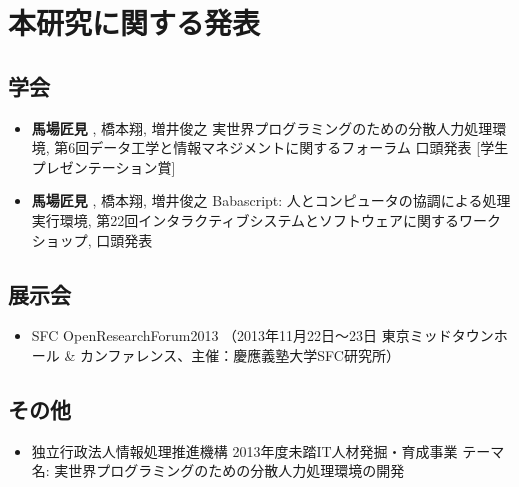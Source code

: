 \chapter*{本研究に関する発表}
\label{chap:publications}

\section*{学会}

\begin{itemize}
\itemsep1pt\parskip0pt
\item
  \textbf{馬場匠見} , 橋本翔, 増井俊之
  実世界プログラミングのための分散人力処理環境,
  第6回データ工学と情報マネジメントに関するフォーラム 口頭発表
  {[}学生プレゼンテーション賞{]}
\item
  \textbf{馬場匠見} , 橋本翔, 増井俊之 Babascript:
  人とコンピュータの協調による処理実行環境,
  第22回インタラクティブシステムとソフトウェアに関するワークショップ,
  口頭発表
\end{itemize}

\section*{展示会}

\begin{itemize}
\itemsep1pt\parskip0pt
\item
  SFC OpenResearchForum2013 （2013年11月22日〜23日
  東京ミッドタウンホール \&
  カンファレンス、主催：慶應義塾大学SFC研究所）
\end{itemize}

\section*{その他}

\begin{itemize}
\itemsep1pt\parskip0pt
\item
  独立行政法人情報処理推進機構 2013年度未踏IT人材発掘・育成事業
  テーマ名: 実世界プログラミングのための分散人力処理環境の開発
\end{itemize}
